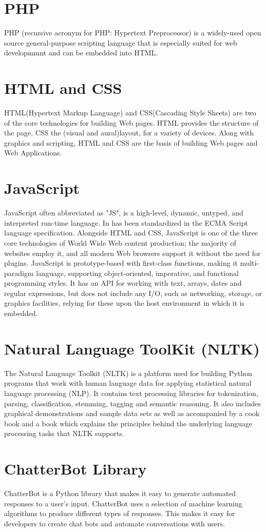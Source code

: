 \documentclass{mnnit}
\begin{document}
\section{PHP}
PHP (recursive acronym for PHP: Hypertext Preprocessor) is a widely-used open source general-purpose scripting language that is especially suited for web developmmnt and can be embedded into HTML.
\section{HTML and CSS}
HTML(Hypertext Markup Language) and CSS(Cascading Style Sheets) are two of the core technologies for building Web pages.  HTML provides the structure of the page, CSS the (visual and aural)layout, for a variety of devices.  Along with graphics and scripting, HTML and CSS are the basis of building Web pages and Web Applications.
\section{JavaScript}
JavaScript often abbreviated as "JS", is a high-level, dynamic, untyped, and interpreted run-time language.  In has been standardized in the ECMA Script language specification.  Alongside HTML and CSS, JavaScript is one of the three core technologies of World Wide Web content production; the majority of websites employ it, and all modern Web browsers support it without the need for plugins.  JavaScript is prototype-based with first-class functions, making it multi-paradigm language, supporting object-oriented, imperative, and functional programming styles.  It has an API for working with text, arrays, dates and regular expressions, but does not include any I/O, such as networking, storage, or graphics facilities, relying for these upon the host environment in which it is embedded.
\section{Natural Language ToolKit (NLTK)}
The Natural Language Toolkit (NLTK) is a platform used for building Python programs that work with human language data for applying statistical natural language processing (NLP). It contains text processing libraries for tokenization, parsing, classification, stemming, tagging and semantic reasoning.  It also includes graphical demonstrations and sample data sets as well as accompanied by a cook book and a book which explains the principles behind the underlying language processing tasks that NLTK supports.
\section{ChatterBot Library}
ChatterBot is a Python library that makes it easy to generate automated responses to a user's input.  ChatterBot uses a selection of machine learning algorithms to produce different types of responses.  This makes it easy for developers to create chat bots and automate conversations with users.
\end{document}
